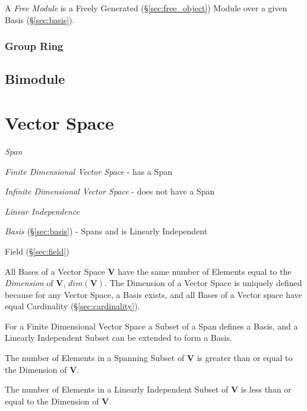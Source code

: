 A \emph{Free Module} is a Freely Generated (\S\ref{sec:free_object})
Module over a given Basis (\S\ref{sec:basis}).



\subsubsection{Group Ring}\label{sec:group_ring}



\subsection{Bimodule}\label{sec:bimodule}



\section{Vector Space}\label{sec:vector_space}

\emph{Span}

\emph{Finite Dimensional Vector Space} - has a Span

\emph{Infinite Dimensional Vector Space} - does not have a Span

\emph{Linear Independence}

\emph{Basis} (\S\ref{sec:basis}) - Spans and is Linearly Independent

Field (\S\ref{sec:field})

All Bases of a Vector Space $\mathbf{V}$ have the same number of
Elements equal to the \emph{Dimension} of $\mathbf{V}$,
$dim(\mathbf{V})$. The Dimension of a Vector Space is uniquely defined
because for any Vector Space, a Basis exists, and all Bases of a
Vector space have equal Cardinality (\S\ref{sec:cardinality}).

For a Finite Dimensional Vector Space a Subset of a Span defines a
Basis, and a Linearly Independent Subset can be extended to form a
Basis.

The number of Elements in a Spanning Subset of $\mathbf{V}$ is greater
than or equal to the Dimension of $\mathbf{V}$.

The number of Elements in a Linearly Independent Subset of
$\mathbf{V}$ is less than or equal to the Dimension of $\mathbf{V}$.

